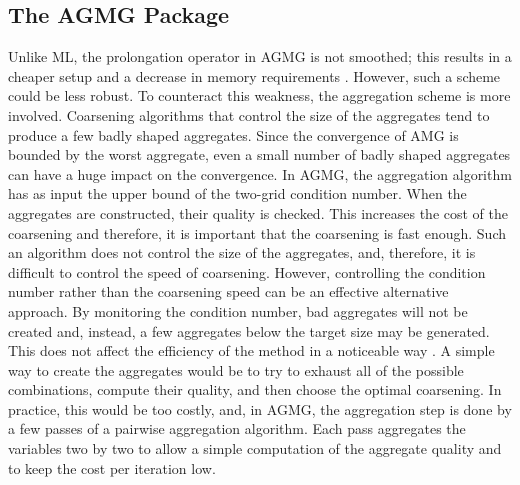 \documentclass[preprint,10pt]{elsarticle}
\renewcommand{\(}{\left(}
\renewcommand{\)}{\right)}
\renewcommand{\[}{\left[}
\renewcommand{\]}{\right]}
\begin{document}
\subsection{The AGMG Package}
Unlike ML, the prolongation operator in AGMG is not smoothed; this results in a
cheaper setup and a decrease in memory requirements \cite{agmg2}. However,
such a scheme could be less robust. To counteract this weakness, the
aggregation scheme is more involved. Coarsening algorithms that control
the size of the aggregates tend to produce a few badly shaped aggregates.
Since the convergence of AMG is bounded by the worst aggregate, even a small 
number of badly shaped aggregates can have a huge impact on
the convergence. In AGMG, the aggregation algorithm has as input the upper
bound of the two-grid condition number. When the aggregates are constructed,
their quality is checked. This increases the cost of the coarsening
and therefore, it is important that the coarsening is fast enough. Such an 
algorithm does not control the size of the aggregates, and, therefore, it is 
difficult to control the speed of coarsening. However, controlling the condition 
number rather than the coarsening speed can be an effective alternative approach. By 
monitoring the condition number, bad aggregates will not be created and, instead, 
a few aggregates below the target size may be generated. This  
does not affect the efficiency of the method in a noticeable way \cite{agmg2}. 
A simple way to create the aggregates would be to try to exhaust all of the possible 
combinations, compute their quality, and then choose the optimal
coarsening. In practice, this would be too costly, and, in AGMG, the aggregation 
step is done by a few passes of a pairwise aggregation algorithm. Each pass
aggregates the variables two by two to allow a simple computation of the aggregate 
quality and to keep the cost per iteration low. 
\end{document}

